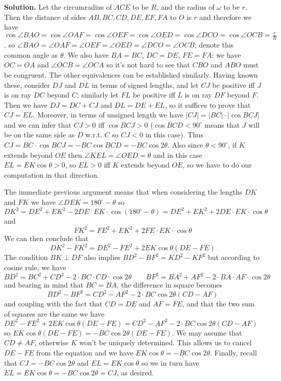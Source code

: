 \documentclass[11pt,a4paper]{article}
\begin{document}
\begin{enumerate}
	\textbf{Solution.} Let the circumradius of $ACE$ to be $R$, and the radius of $\omega$ to be $r$. Then the distance of sides $AB, BC, CD, DE, EF, FA$ to $O$ is $r$ and therefore we have $\cos\angle BAO=\cos \angle OAF=\cos \angle OEF=\cos \angle OED=\cos \angle DCO=\cos \angle OCB=\frac{r}{R}$, so $\angle BAO=\angle OAF=\angle OEF=\angle OED=\angle DCO=\angle OCB$; denote this common angle as $\theta$. 
	We also have $BA=BC$, $DC=DE$, $FE=FA$: we have $OC=OA$ and $\angle OCB=\angle OCA$ so it's not hard to see that $CBO$ and $ABO$ must be congruent. The other equivalences can be established similarly. 
	Having known these, consider $DJ$ and $DL$ in terms of signed lengths, and let $CJ$ be positive iff $J$ is on ray $DC$ beyond $C$; similarly let $FL$ be positive iff $L$ is on ray $DF$ beyond $F$. Then we have $DJ=DC+CJ$ and $DL=DE+EL$, so it suffices to prove that $CJ=EL$. 
	Moreover, in terms of unsigned length we have $|CJ|=|BC|\cdot |\cos BCJ|$ and we can infer that $CJ>0$ iff $\cos BCJ>0$ ($\cos BCD<90^{\circ}$ means that $J$ will be on the same side as $D$ w.r.t. $C$ so $CJ<0$ in this case). 
	Thus $CJ=BC\cdot \cos BCJ=-BC\cos BCD=-BC\cos 2\theta$. 
	Also since $\theta<90^{\circ}$, if $K$ extends beyond $OE$ then $\angle KEL=\angle OED=\theta$ and in this case $EL=EK\cos\theta > 0$, so $EL>0$ iff $K$ extends beyond $OE$, so we have to do our computation in that direction. 
	
	The immediate previous argument means that when considering the lengths $DK$ and $FK$ we have $\angle DEK=180^{\circ}-\theta$ so 
	\[DK^2=DE^2+EK^2-2DE\cdot EK\cdot \cos(180^{\circ}-\theta)=DE^2+EK^2+2DE\cdot EK\cdot \cos\theta\] and \[FK^2=FE^2+EK^2+2FE\cdot EK\cdot \cos\theta\] 
	We can then conclude that 
	\[
	DK^2-FK^2=DE^2-FE^2+2EK\cos\theta(DE-FE)
	\]
	The condition $BK\perp DF$ also implies $BD^2-BF^2=KD^2-KF^2$ but according to cosine rule, we have \[BD^2=BC^2+CD^2-2\cdot BC\cdot CD\cdot \cos 2\theta\qquad
	  BF^2=BA^2+AF^2-2\cdot BA\cdot AF\cdot \cos 2\theta
	\]
	and bearing in mind that $BC=BA$, the difference in square becomes 
	\[BD^2-BF^2 = CD^2-AF^2-2\cdot BC \cos 2\theta (CD-AF)
	\]
	and coupling with the fact that $CD=DE$ and $AF=FE$, and that the two sum of squares are the same we have 
	$DE^2-FE^2+2EK\cos\theta(DE-FE)=CD^2-AF^2-2\cdot BC \cos 2\theta (CD-AF)$ so $EK\cos\theta(DE-FE)=-BC \cos 2\theta (DE-FE)$. We may assume that $CD\neq AF$, otherwise $K$ won't be uniquely determined. This allows us to cancel $DE-FE$ from the equation and we have $EK\cos\theta = -BC\cos 2\theta$. 
	Finally, recall that $CJ=-BC\cos 2\theta$ and $EL=EK\cos\theta$ so we in turn have $EL=EK\cos\theta = -BC\cos 2\theta=CJ$, as desired. 
	

\end{enumerate}
\end{document}
